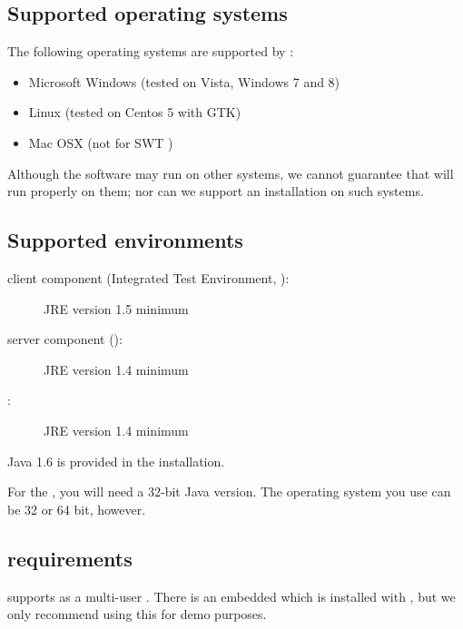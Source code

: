 
\subsection{Supported operating systems}
The following operating systems are supported by \app{}:
\begin{itemize}
  \item Microsoft Windows (tested on Vista, Windows 7 and 8)
  \item  Linux (tested on Centos 5 with GTK)
  \item Mac OSX (not for SWT \gdauts{})%

\end{itemize}

Although the software may run on other systems, we cannot guarantee that \app{} will run properly on them; nor can we support an installation on such systems.

\subsection{Supported  environments}
\begin{description}
\item [\app{} client component (Integrated Test Environment, \ite{}):]{JRE version 1.5 minimum}
\item [\app{} server component (\gdagent):]{JRE version 1.4 minimum}
\item [\gdaut{}:]{JRE version 1.4 minimum}
\end{description}
Java 1.6 is provided in the \app{} installation.  

For the \ite{}, you will need a 32-bit Java version. The operating system you use can be 32 or 64 bit, however. 

\subsection{\gdDB requirements}
\app{} supports   as a multi-user \gddb{}. There is an embedded \gddb{} which is installed with \app{}, but we only recommend using this for demo purposes. 

